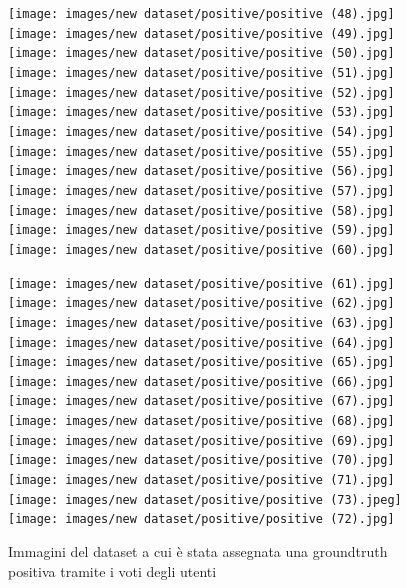 \begin{figure}[H]
\centering
\texttt{[image: images/new dataset/positive/positive (48).jpg]}\quad
\texttt{[image: images/new dataset/positive/positive (49).jpg]}\quad
\vspace{5mm}
\texttt{[image: images/new dataset/positive/positive (50).jpg]}\quad
\texttt{[image: images/new dataset/positive/positive (51).jpg]}\quad
\texttt{[image: images/new dataset/positive/positive (52).jpg]}\quad
\vspace{5mm}
\texttt{[image: images/new dataset/positive/positive (53).jpg]}
\quad
\vspace{5mm}
\texttt{[image: images/new dataset/positive/positive (54).jpg]}\quad
\texttt{[image: images/new dataset/positive/positive (55).jpg]}\quad
\texttt{[image: images/new dataset/positive/positive (56).jpg]}\quad
\vspace{5mm}
\texttt{[image: images/new dataset/positive/positive (57).jpg]}\quad
\texttt{[image: images/new dataset/positive/positive (58).jpg]}\quad
\texttt{[image: images/new dataset/positive/positive (59).jpg]}\quad
\texttt{[image: images/new dataset/positive/positive (60).jpg]}\quad
\end{figure}

\begin{figure}[H]
\centering
\texttt{[image: images/new dataset/positive/positive (61).jpg]}\quad
\texttt{[image: images/new dataset/positive/positive (62).jpg]}\quad
\vspace{5mm}
\texttt{[image: images/new dataset/positive/positive (63).jpg]}\quad
\texttt{[image: images/new dataset/positive/positive (64).jpg]}
\quad
\vspace{5mm}
\texttt{[image: images/new dataset/positive/positive (65).jpg]}\quad
\texttt{[image: images/new dataset/positive/positive (66).jpg]}\quad
\vspace{5mm}
\texttt{[image: images/new dataset/positive/positive (67).jpg]}\quad
\texttt{[image: images/new dataset/positive/positive (68).jpg]}\quad
\texttt{[image: images/new dataset/positive/positive (69).jpg]}\quad
\vspace{5mm}
\texttt{[image: images/new dataset/positive/positive (70).jpg]}\quad
\texttt{[image: images/new dataset/positive/positive (71).jpg]}\quad
\texttt{[image: images/new dataset/positive/positive (73).jpeg]}
\quad
\texttt{[image: images/new dataset/positive/positive (72).jpg]}\quad
\caption{Immagini del dataset a cui è stata assegnata una groundtruth positiva tramite i voti degli utenti}
\label{positiveNew}
\end{figure}

